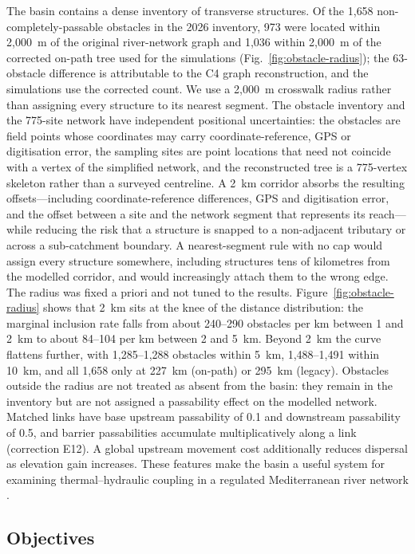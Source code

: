 \documentclass[11pt,a4paper]{article}
\begin{document}
The basin contains a dense inventory of transverse structures. Of the 1{,}658 non-completely-passable obstacles in the 2026 inventory, 973 were located within 2{,}000~m of the original river-network graph and 1{,}036 within 2{,}000~m of the corrected on-path tree used for the simulations (Fig.~\ref{fig:obstacle-radius}); the 63-obstacle difference is attributable to the C4 graph reconstruction, and the simulations use the corrected count. We use a 2{,}000~m crosswalk radius rather than assigning every structure to its nearest segment. The obstacle inventory and the 775-site network have independent positional uncertainties: the obstacles are field points whose coordinates may carry coordinate-reference, GPS or digitisation error, the sampling sites are point locations that need not coincide with a vertex of the simplified network, and the reconstructed tree is a 775-vertex skeleton rather than a surveyed centreline. A 2~km corridor absorbs the resulting offsets---including coordinate-reference differences, GPS and digitisation error, and the offset between a site and the network segment that represents its reach---while reducing the risk that a structure is snapped to a non-adjacent tributary or across a sub-catchment boundary. A nearest-segment rule with no cap would assign every structure somewhere, including structures tens of kilometres from the modelled corridor, and would increasingly attach them to the wrong edge. The radius was fixed a priori and not tuned to the results. Figure~\ref{fig:obstacle-radius} shows that 2~km sits at the knee of the distance distribution: the marginal inclusion rate falls from about 240--290 obstacles per km between 1 and 2~km to about 84--104 per km between 2 and 5~km. Beyond 2~km the curve flattens further, with 1{,}285--1{,}288 obstacles within 5~km, 1{,}488--1{,}491 within 10~km, and all 1{,}658 only at 227~km (on-path) or 295~km (legacy). Obstacles outside the radius are not treated as absent from the basin: they remain in the inventory but are not assigned a passability effect on the modelled network. Matched links have base upstream passability of 0.1 and downstream passability of 0.5, and barrier passabilities accumulate multiplicatively along a link (correction E12). A global upstream movement cost additionally reduces dispersal as elevation gain increases. These features make the basin a useful system for examining thermal--hydraulic coupling in a regulated Mediterranean river network \cite{PerkinGido2012,Larsenetal2021}.

\subsection{Objectives}
\end{document}
